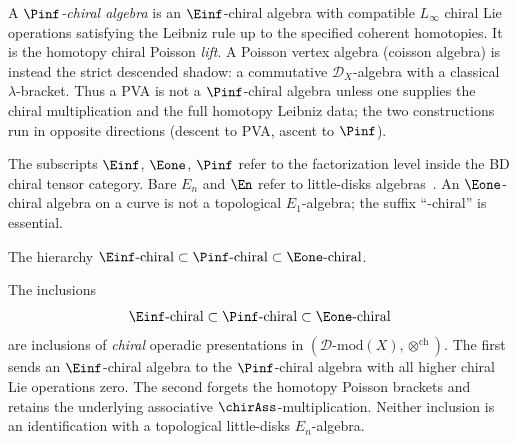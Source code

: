 \begin{definition}
\label{def:pinf-chiral}
A \emph{$\Pinf$-chiral algebra} is an $\Einf$-chiral algebra with
compatible $L_\infty$ chiral Lie operations satisfying the Leibniz
rule up to the specified coherent homotopies. It is the
homotopy chiral Poisson \emph{lift}. A Poisson vertex algebra
\textup{(}coisson algebra\textup{)} is instead the strict descended
shadow: a commutative $\mathcal D_X$-algebra with a classical
$\lambda$-bracket. Thus a PVA is not a $\Pinf$-chiral algebra unless
one supplies the chiral multiplication and the full homotopy
Leibniz data; the two constructions run in opposite directions
\textup{(}descent to PVA, ascent to $\Pinf$\textup{)}.
\end{definition}

\begin{remark}\label{rem:En-terminology}
The subscripts $\Einf$, $\Eone$, $\Pinf$ refer to the
factorization level inside the BD chiral tensor category. Bare
$E_n$ and $\En$ refer to little-disks
algebras~\cite[\S5.1]{HA}. An $\Eone$-chiral algebra on a
curve is not a topological $E_1$-algebra; the suffix
``-chiral'' is essential.
\end{remark}

The hierarchy
$\Einf\text{-chiral} \subset \Pinf\text{-chiral} \subset
\Eone\text{-chiral}$.

\begin{proposition}
\label{prop:chiral-operadic-hierarchy}
The inclusions
\[
 \Einf\text{-chiral}
 \subset
 \Pinf\text{-chiral}
 \subset
 \Eone\text{-chiral}
\]
are inclusions of \emph{chiral} operadic presentations in
\((\mathcal D\text{-mod}(X),\otimes^{\mathrm{ch}})\). The first sends
an \(\Einf\)-chiral algebra to the \(\Pinf\)-chiral algebra with all
higher chiral Lie operations zero. The second forgets the homotopy
Poisson brackets and retains the underlying associative
\(\chirAss\)-multiplication. Neither inclusion is an identification
with a topological little-disks \(E_n\)-algebra.
\end{proposition}

